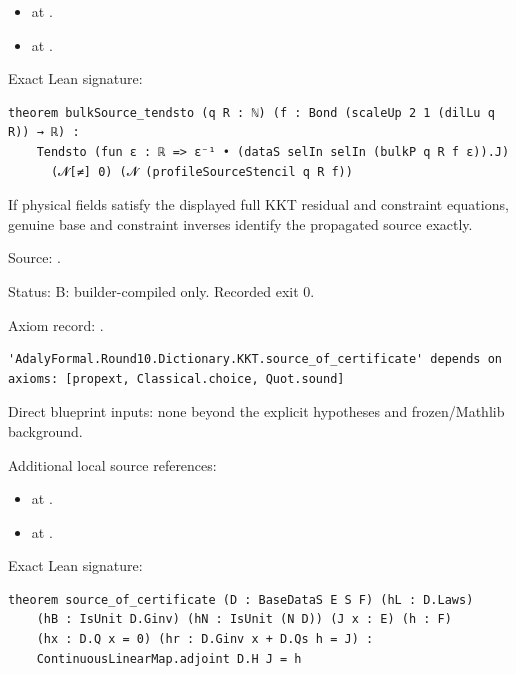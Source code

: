 \begin{theorem}[bp-139]
\begin{itemize}
\item \texttt{} at \texttt{}.
\item \texttt{} at \texttt{}.
\end{itemize}
\par Exact Lean signature:
\begin{verbatim}
theorem bulkSource_tendsto (q R : ℕ) (f : Bond (scaleUp 2 1 (dilLu q R)) → ℝ) :
    Tendsto (fun ε : ℝ => ε⁻¹ • (dataS selIn selIn (bulkP q R f ε)).J)
      (𝓝[≠] 0) (𝓝 (profileSourceStencil q R f))
\end{verbatim}
\end{theorem}

\begin{theorem}[bp-140]
\label{bp-140}
\uses{}
\leanok
If physical fields satisfy the displayed full KKT residual and constraint equations, genuine base and constraint inverses identify the propagated source exactly.

\par Source: \texttt{}.
\par Status: B: builder-compiled only. Recorded exit 0.
\par Axiom record: \texttt{}.
\begin{verbatim}
'AdalyFormal.Round10.Dictionary.KKT.source_of_certificate' depends on axioms: [propext, Classical.choice, Quot.sound]
\end{verbatim}
\par Direct blueprint inputs: none beyond the explicit hypotheses and frozen/Mathlib background.
\par Additional local source references:
\begin{itemize}
\item \texttt{} at \texttt{}.
\item \texttt{} at \texttt{}.
\end{itemize}
\par Exact Lean signature:
\begin{verbatim}
theorem source_of_certificate (D : BaseDataS E S F) (hL : D.Laws)
    (hB : IsUnit D.Ginv) (hN : IsUnit (N D)) (J x : E) (h : F)
    (hx : D.Q x = 0) (hr : D.Ginv x + D.Qs h = J) :
    ContinuousLinearMap.adjoint D.H J = h
\end{verbatim}
\end{theorem}

